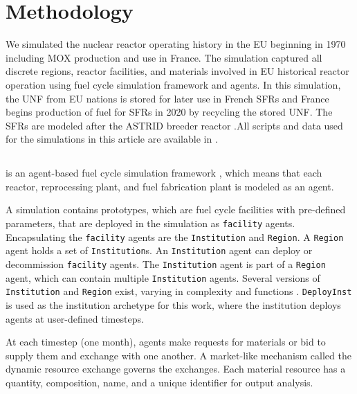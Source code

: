 
\section{Methodology}
We simulated the nuclear reactor operating history in the \gls{EU} beginning in 
1970 including \gls{MOX} production and use in France. 
The simulation captured all discrete regions, reactor facilities, and materials 
involved in \gls{EU} historical reactor operation
using \Cyclus fuel cycle simulation framework and \Cycamore agents.
In this simulation, the \gls{UNF} from \gls{EU} nations is stored for later use 
in French \glspl{SFR} and France begins production of fuel for \glspl{SFR}
in 2020 by recycling the stored \gls{UNF}.
The \glspl{SFR} are modeled after the \gls{ASTRID} breeder reactor \cite{varaine_pre-conceptual_2012}.All scripts and data used for the simulations in this article are available in 
\cite{bae_arfc/transition-scenarios:_2017}.


\subsection{\Cyclus}

\Cyclus is an agent-based fuel cycle simulation framework 
\cite{huff_fundamental_2016}, which means 
that each reactor, reprocessing plant, and fuel fabrication plant is modeled as an agent.

A \Cyclus simulation contains prototypes, which are fuel cycle facilities with
pre-defined parameters, that are deployed in the simulation as \texttt{facility} agents.
Encapsulating the \texttt{facility} agents are the \texttt{Institution} and \texttt{Region}.
A \texttt{Region} agent holds a set of \texttt{Institution}s. 
An \texttt{Institution} agent can deploy or decommission \texttt{facility} agents.
The \texttt{Institution} agent is part of a \texttt{Region} agent,
which can contain multiple \texttt{Institution} agents. Several versions of \texttt{Institution}
and \texttt{Region} exist, varying in complexity and functions \cite{huff_extensions_2014}.
 \texttt{DeployInst} is used as the institution archetype for this work, where the institution
deploys agents at user-defined timesteps. 

At each timestep (one month),
agents make requests for materials or bid to supply them and exchange
with one another. A market-like mechanism called the dynamic resource exchange
\cite{gidden_agent-based_2015} governs the exchanges.
Each material resource has a quantity, composition, name, and a unique identifier
for output analysis. 

